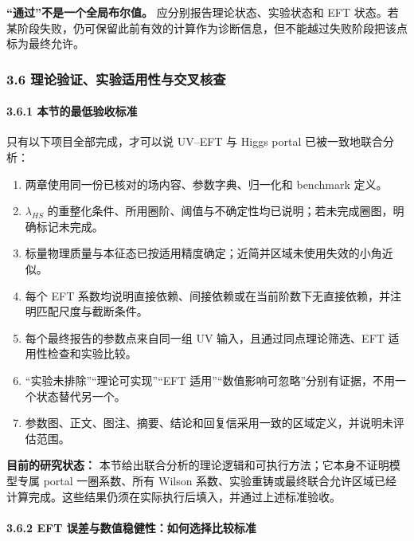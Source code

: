\documentclass[
]{article}
\providecommand{\tightlist}{%
  \setlength{\itemsep}{0pt}\setlength{\parskip}{0pt}}
\begin{document}
\textbf{``通过''不是一个全局布尔值。} 应分别报告理论状态、实验状态和 EFT
状态。若某阶段失败，仍可保留此前有效的计算作为诊断信息，但不能越过失败阶段把该点标为最终允许。

\subsubsection{3.6
理论验证、实验适用性与交叉核查}\label{ux7406ux8bbaux9a8cux8bc1ux5b9eux9a8cux9002ux7528ux6027ux4e0eux4ea4ux53c9ux6838ux67e5-1}

\paragraph{3.6.1
本节的最低验收标准}\label{ux672cux8282ux7684ux6700ux4f4eux9a8cux6536ux6807ux51c6}

只有以下项目全部完成，才可以说 UV--EFT 与 Higgs portal
已被一致地联合分析：

\begin{enumerate}
\def\labelenumi{\arabic{enumi}.}
\tightlist
\item
  两章使用同一份已核对的场内容、参数字典、归一化和 benchmark 定义。
\item
  \(\lambda_{HS}\)
  的重整化条件、所用圈阶、阈值与不确定性均已说明；若未完成圈图，明确标记未完成。
\item
  标量物理质量与本征态已按适用精度确定；近简并区域未使用失效的小角近似。
\item
  每个 EFT
  系数均说明直接依赖、间接依赖或在当前阶数下无直接依赖，并注明匹配尺度与截断条件。
\item
  每个最终报告的参数点来自同一组 UV 输入，且通过同点理论筛选、EFT
  适用性检查和实验比较。
\item
  ``实验未排除''``理论可实现''``EFT
  适用''``数值影响可忽略''分别有证据，不用一个状态替代另一个。
\item
  参数图、正文、图注、摘要、结论和回复信采用一致的区域定义，并说明未评估范围。
\end{enumerate}

\textbf{目前的研究状态：}
本节给出联合分析的理论逻辑和可执行方法；它本身不证明模型专属 portal
一圈系数、所有 Wilson
系数、实验重铸或最终联合允许区域已经计算完成。这些结果仍须在实际执行后填入，并通过上述标准验收。

\paragraph{3.6.2 EFT
误差与数值稳健性：如何选择比较标准}\label{eft-ux8befux5deeux4e0eux6570ux503cux7a33ux5065ux6027ux5982ux4f55ux9009ux62e9ux6bd4ux8f83ux6807ux51c6}
\end{document}
